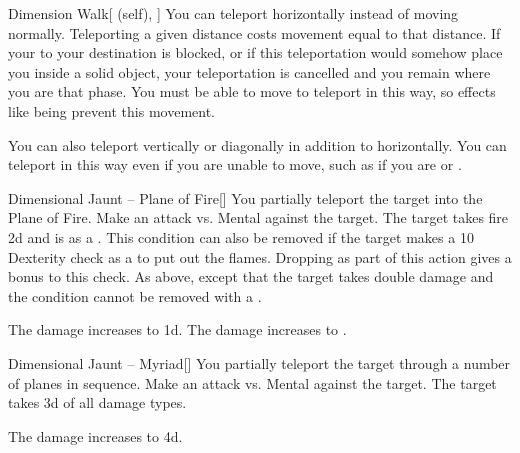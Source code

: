 \lowercase{\hypertarget{spell:Dimension Walk}{}}\label{spell:Dimension Walk}
\begin{attuneability}[Rank 4]{\hypertarget{spell:Dimension Walk}{Dimension Walk}}[ (self), ]
You can teleport horizontally instead of moving normally.
Teleporting a given distance costs movement equal to that distance.
If your  to your destination is blocked, or if this teleportation would somehow place you inside a solid object, your teleportation is cancelled and you remain where you are that phase.
You must be able to move to teleport in this way, so effects like being  prevent this movement.

\rankline
{} You can also teleport vertically or diagonally in addition to horizontally.
 You can teleport in this way even if you are unable to move, such as if you are  or .
\end{attuneability}
\vspace{0.25em}



\lowercase{\hypertarget{spell:Dimensional Jaunt -- Plane of Fire}{}}\label{spell:Dimensional Jaunt -- Plane of Fire}
\begin{freeability}[Rank 4]{\hypertarget{spell:Dimensional Jaunt -- Plane of Fire}{Dimensional Jaunt -- Plane of Fire}}[]
You partially teleport the target into the Plane of Fire.
Make an attack vs. Mental against the target.
\hit The target takes fire  \minus2d and is  as a .
This condition can also be removed if the target makes a  10 Dexterity check as a  to put out the flames.
Dropping  as part of this action gives a  bonus to this check.
\crit As above, except that the target takes double damage and the condition cannot be removed with a .

\rankline
{} The damage increases to  \minus1d.
 The damage increases to .
\end{freeability}
\vspace{0.25em}



\lowercase{\hypertarget{spell:Dimensional Jaunt -- Myriad}{}}\label{spell:Dimensional Jaunt -- Myriad}
\begin{freeability}[Rank 5]{\hypertarget{spell:Dimensional Jaunt -- Myriad}{Dimensional Jaunt -- Myriad}}[]
You partially teleport the target through a number of planes in sequence.
Make an attack vs. Mental against the target.
\hit The target takes  \plus3d of all damage types.

\rankline
{} The damage increases to  \plus4d.
\end{freeability}
\vspace{0.25em}



